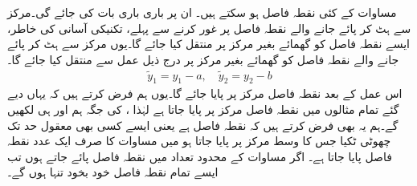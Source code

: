 مساوات  کے کئی نقطہ فاصل ہو سکتے ہیں۔ ان پر باری باری بات کی جائے گی۔مرکز سے ہٹ کر پائے جانے والے نقطہ فاصل پر غور کرنے سے پہلے، تکنیکی آسانی کی خاطر، ایسے نقطہ فاصل کو گھمائے بغیر  مرکز پر منتقل کیا جائے گا۔یوں مرکز  سے ہٹ کر پائے جانے والے نقطہ فاصل  کو گھمائے بغیر  مرکز  پر درج ذیل عمل سے منتقل کیا جائے گا۔
\begin{align*}
\tilde{y}_1=y_1-a,\quad \tilde{y}_2=y_2-b
\end{align*}
اس عمل کے بعد نقطہ فاصل  مرکز  پر پایا جائے گا۔یوں ہم فرض کرتے ہیں کہ یہاں دیے گئے تمام مثالوں میں نقطہ  فاصل مرکز پر پایا جاتا ہے لہٰذا ،  کی جگہ ہم  اور  ہی لکھیں گے۔ہم یہ بھی فرض کرتے ہیں کہ نقطہ فاصل   ہے یعنی ایسے کسی بھی معقول حد تک چھوٹی ٹکیا جس کا وسط مرکز پر پایا جاتا ہو میں مساوات   کا صرف  ایک عدد نقطہ فاصل پایا جاتا ہے۔ اگر مساوات  کے محدود تعداد میں نقطہ فاصل پائے جاتے ہوں تب ایسے تمام نقطہ فاصل خود بخود تنہا ہوں گے۔


